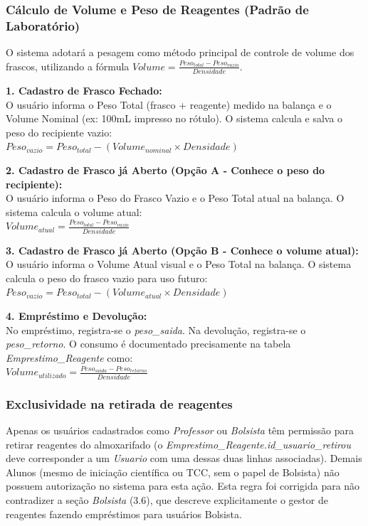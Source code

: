 \documentclass[12pt,a4paper]{article}
\begin{document}
\subsubsection{Cálculo de Volume e Peso de Reagentes (Padrão de Laboratório)}
\begin{regra}
O sistema adotará a pesagem como método principal de controle de volume dos frascos, utilizando a fórmula $Volume = \frac{Peso_{total} - Peso_{vazio}}{Densidade}$. 

\textbf{1. Cadastro de Frasco Fechado:}\\
O usuário informa o Peso Total (frasco + reagente) medido na balança e o Volume Nominal (ex: 100mL impresso no rótulo). O sistema calcula e salva o peso do recipiente vazio:\\
$Peso_{vazio} = Peso_{total} - (Volume_{nominal} \times Densidade)$

\textbf{2. Cadastro de Frasco já Aberto (Opção A - Conhece o peso do recipiente):}\\
O usuário informa o Peso do Frasco Vazio e o Peso Total atual na balança. O sistema calcula o volume atual:\\
$Volume_{atual} = \frac{Peso_{total} - Peso_{vazio}}{Densidade}$

\textbf{3. Cadastro de Frasco já Aberto (Opção B - Conhece o volume atual):}\\
O usuário informa o Volume Atual visual e o Peso Total na balança. O sistema calcula o peso do frasco vazio para uso futuro:\\
$Peso_{vazio} = Peso_{total} - (Volume_{atual} \times Densidade)$

\textbf{4. Empréstimo e Devolução:}\\
No empréstimo, registra-se o \textit{peso\_saida}. Na devolução, registra-se o \textit{peso\_retorno}. O consumo é documentado precisamente na tabela \textit{Emprestimo\_Reagente} como:\\
$Volume_{utilizado} = \frac{Peso_{saida} - Peso_{retorno}}{Densidade}$
\end{regra}

\subsubsection{Exclusividade na retirada de reagentes}
\begin{regra}
Apenas os usuários cadastrados como \textit{Professor} ou \textit{Bolsista} têm permissão para retirar reagentes do almoxarifado (o \textit{Emprestimo\_Reagente.id\_usuario\_retirou} deve corresponder a um \textit{Usuario} com uma dessas duas linhas associadas). Demais Alunos (mesmo de iniciação científica ou TCC, sem o papel de Bolsista) não possuem autorização no sistema para esta ação. Esta regra foi corrigida para não contradizer a seção \textit{Bolsista} (3.6), que descreve explicitamente o gestor de reagentes fazendo empréstimos para usuários Bolsista.
\end{regra}
\end{document}

